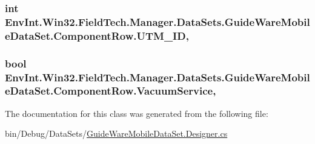 \subsubsection[{U\+T\+M\+\_\+\+I\+D}]{\setlength{\rightskip}{0pt plus 5cm}int Env\+Int.\+Win32.\+Field\+Tech.\+Manager.\+Data\+Sets.\+Guide\+Ware\+Mobile\+Data\+Set.\+Component\+Row.\+U\+T\+M\+\_\+\+I\+D\hspace{0.3cm}{\ttfamily [get]}, {\ttfamily [set]}}\label{class_env_int_1_1_win32_1_1_field_tech_1_1_manager_1_1_data_sets_1_1_guide_ware_mobile_data_set_1_1_component_row_a1be53aab89f234d1f4e37fedf101984d}
\hypertarget{class_env_int_1_1_win32_1_1_field_tech_1_1_manager_1_1_data_sets_1_1_guide_ware_mobile_data_set_1_1_component_row_aa52ea0758f4d310eb939e3ca5e02d763}{}
\subsubsection[{Vacuum\+Service}]{\setlength{\rightskip}{0pt plus 5cm}bool Env\+Int.\+Win32.\+Field\+Tech.\+Manager.\+Data\+Sets.\+Guide\+Ware\+Mobile\+Data\+Set.\+Component\+Row.\+Vacuum\+Service\hspace{0.3cm}{\ttfamily [get]}, {\ttfamily [set]}}\label{class_env_int_1_1_win32_1_1_field_tech_1_1_manager_1_1_data_sets_1_1_guide_ware_mobile_data_set_1_1_component_row_aa52ea0758f4d310eb939e3ca5e02d763}


The documentation for this class was generated from the following file\+:\begin{DoxyCompactItemize}
\item 
bin/\+Debug/\+Data\+Sets/\hyperlink{bin_2_debug_2_data_sets_2_guide_ware_mobile_data_set_8_designer_8cs}{Guide\+Ware\+Mobile\+Data\+Set.\+Designer.\+cs}\end{DoxyCompactItemize}
